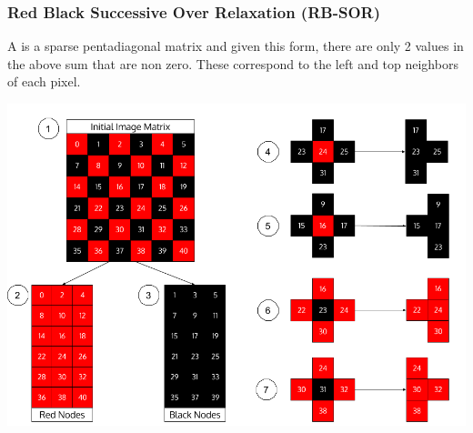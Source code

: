 \documentclass[english]{article}
\begin{document}
	\subsubsection{Red Black Successive Over Relaxation (RB-SOR)}
	A is a sparse pentadiagonal matrix and given this form, there are only 2 values in the above sum that are non zero. These correspond to the left and top neighbors of each pixel. \newline 

	\begin{center}
	\includegraphics[width=175mm]{results/images/5-rb_order.png}
	\end{center}	
\end{document}
